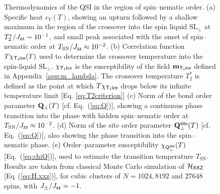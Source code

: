 \documentclass[apsrev4-1,prx,superscriptaddress,floatfix,twocolumn,longbibliography]{revtex4-1}
\begin{document}
\begin{appendix}
\begin{figure}
   \\
   \\
   \\
  \\
  \\
  \caption{
    Thermodynamics of the QSI in the region of spin--nematic order.     
    (a) Specific heat $c_V(T)$, showing an upturn followed by a 
shallow maximum in the region of the 
    crossover into the spin liquid $\text{SL}_\perp$ at $T_2^*/J_{\sf zz} \sim 10^{-1}$, 
    and small peak associated with the onset of spin--nematic order at 
    $T_\text{SN}/J_{\sf zz} \approx 10^{-2}$.
(b) Correlation function $T \chi_{\sf T_1 ice}(T)$ used to determine the crossover
temperature into the spin-liquid $\text{SL}_\perp$.
%
$\chi_{\sf T_1 ice}$ is the susceptibility of the field ${\bf m}_{\sf T_1 ice}$
defined in Appendix~\ref{app:m_lambda}.
%
The crossover temperature $T_2^{\ast}$ is defined as the point at which
$T \chi_{\sf T_1 ice}$ drops below its infinite temperature limit
[Eq. \ref{eq:T2criterion}]
%
(c) Norm of the bond order parameter ${\bf Q}_\perp (T)$ [cf. Eq.~(\ref{eq:Q})], 
    showing a continuous phase transition into the phase 
    with hidden spin--nematic order at $T_\text{SN}/J_{\sf zz} \approx 10^{-2}$.
%
    (d) Norm of the site order parameter ${\bf Q}^{\sf site}_\perp (T)$ [cf. Eq.~(\ref{eq:Q})], 
    also showing the phase transition into the spin--nematic phase.
    (e) Order--parameter susceptibility $\chi_{\sf Q_\perp^{\sf site}}(T)$ [Eq.~(\ref{eq:chiQ})], 
    used to estimate the transition temperature $T_\text{SN}$.
    Results are taken from classical Monte Carlo simulation of
    $\mathcal{H}_{\sf XXZ}$ [Eq~(\ref{eq:H.xxz})], for cubic clusters
    of $N=1024, 8192$ and $27648$ spins, with $J_{\pm}/J_{\sf zz}=-1$.}
  \label{thermo}
\end{figure}



\end{appendix}
\end{document}
